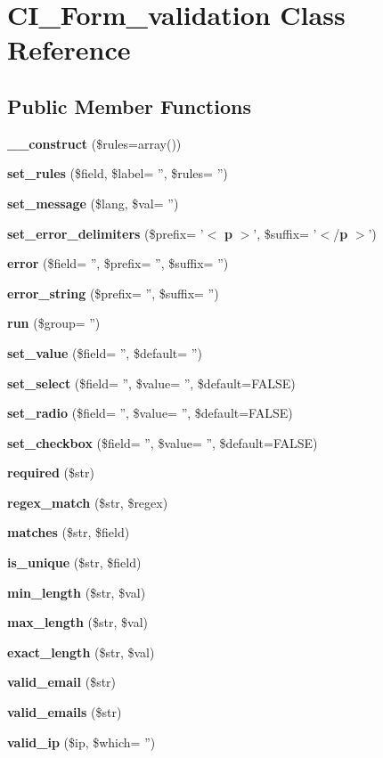 \section{C\-I\-\_\-\-Form\-\_\-validation Class Reference}
\label{class_c_i___form__validation}
\subsection*{Public Member Functions}
\begin{DoxyCompactItemize}
\item 
{\bf \-\_\-\-\_\-construct} (\$rules=array())
\item 
{\bf set\-\_\-rules} (\$field, \$label= '', \$rules= '')
\item 
{\bf set\-\_\-message} (\$lang, \$val= '')
\item 
{\bf set\-\_\-error\-\_\-delimiters} (\$prefix= '$<$ {\bf p} $>$', \$suffix= '$<$/{\bf p} $>$')
\item 
{\bf error} (\$field= '', \$prefix= '', \$suffix= '')
\item 
{\bf error\-\_\-string} (\$prefix= '', \$suffix= '')
\item 
{\bf run} (\$group= '')
\item 
{\bf set\-\_\-value} (\$field= '', \$default= '')
\item 
{\bf set\-\_\-select} (\$field= '', \$value= '', \$default=F\-A\-L\-S\-E)
\item 
{\bf set\-\_\-radio} (\$field= '', \$value= '', \$default=F\-A\-L\-S\-E)
\item 
{\bf set\-\_\-checkbox} (\$field= '', \$value= '', \$default=F\-A\-L\-S\-E)
\item 
{\bf required} (\$str)
\item 
{\bf regex\-\_\-match} (\$str, \$regex)
\item 
{\bf matches} (\$str, \$field)
\item 
{\bf is\-\_\-unique} (\$str, \$field)
\item 
{\bf min\-\_\-length} (\$str, \$val)
\item 
{\bf max\-\_\-length} (\$str, \$val)
\item 
{\bf exact\-\_\-length} (\$str, \$val)
\item 
{\bf valid\-\_\-email} (\$str)
\item 
{\bf valid\-\_\-emails} (\$str)
\item 
{\bf valid\-\_\-ip} (\$ip, \$which= '')
\item 

\end{DoxyCompactItemize}
